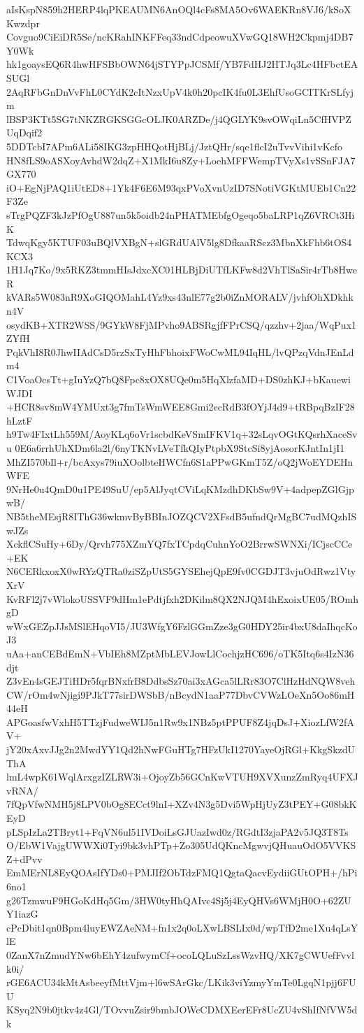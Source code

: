 aIsKspN859h2HERP4lqPKEAUMN6AnOQl4cFs8MA5Ov6WAEKRn8VJ6/kSoXKwzdpr
Covguo9CiEiDR5Se/ncKRahINKFFeq33ndCdpeowuXVwGQ18WH2Ckpmj4DB7Y0Wk
hk1goaysEQ6R4hwHFSBbOWN64jSTYPpJCSMf/YB7FdHJ2HTJq3Lc4HFbctEASUGl
2AqRFbGnDnVvFhL0CYdK2cItNzxUpV4k0h20pcIK4fu0L3EhfUsoGCITKrSLfyjm
lBSP3KTt5SG7tNKZRGKSGGcOLJK0ARZDe/j4QGLYK9svOWqiLn5CfHVPZUqDqif2
5DDTcbI7APm6ALi58IKG3zpHHQotHjBLj/JztQHr/sqe1flcI2uTvvVihi1vKcfo
HN8fLS9oASXoyAvhdW2dqZ+X1MkI6u8Zy+LoehMFFWempTVyXs1vSSnFJA7GX770
iO+EgNjPAQ1iUtED8+1Yk4F6E6M93qxPVoXvnUzID7SNotiVGKtMUEb1Cn22F3Ze
sTrgPQZF3kJzPfOgU887un5k5oidb24nPHATMEbfgOgeqo5baLRP1qZ6VRCt3HiK
TdwqKgy5KTUF03uBQlVXBgN+slGRdUAlV5lg8DfkaaRScz3MbnXkFhb6tOS4KCX3
1H1Jq7Ko/9x5RKZ3tmmHIsJdxcXC01HLBjDiUTfLKFw8d2VhTlSaSir4rTb8HweR
kVARs5W083nR9XoGIQOMahL4Yz9xs43nlE77g2b0iZnMORALV/jvhfOhXDkhkn4V
osydKB+XTR2WSS/9GYkW8FjMPvho9ABSRgjfFPrCSQ/qzzhv+2jaa/WqPux1ZYfH
PqkVhI8R0JhwIIAdCsD5rzSxTyHhFbhoixFWoCwML94IqHL/lvQPzqVdnJEnLdm4
C1VoaOcsTt+gIuYzQ7bQ8Fpc8xOX8UQe0m5HqXlzfaMD+DS0zhKJ+bKauewiWJDI
+HCR8sv8mW4YMUxt3g7fmTsWmWEE8Gmi2ecRdB3fOYjJ4d9+tRBpqBzIF28hLztF
h9Tw4FIxtLh559M/AoyKLq6oVr1scbdKeVSmIFKV1q+32sLqvOGtKQsrhXaceSvu
0E6a6rrhUhXDm6la2l/6nyTKNvLVeTfkQIyPtpbX9StcSi8yjAosorKJntIn1jI1
MhZI570bIl+r/bcAxys79iuXOolbteHWCfn6S1aPPwGKmT5Z/oQ2jWoEYDEHnWFE
9NrHe0u4QmD0u1PE49SuU/ep5AlJyqtCViLqKMzdhDKbSw9V+4adpepZGlGjpwB/
NB5theMEsjR8IThG36wkmvByBBInJOZQCV2XFsdB5ufndQrMgBC7udMQzhISwJZs
XckflCSuHy+6Dy/Qrvh775XZmYQ7fxTCpdqCuhnYoO2BrrwSWNXi/ICjscCCe+EK
N6CERkxoxX0wRYzQTRa0ziSZpUtS5GYSEhejQpE9fv0CGDJT3vjuOdRwz1VtyXrV
KvRFl2j7vWlokoUSSVF9dHm1ePdtjfxh2DKilm8QX2NJQM4hExoixUE05/ROmhgD
wWxGEZpJJsMSlEHqoVI5/JU3WfgY6FzlGGmZze3gG0HDY25ir4bxU8daIhqcKoJ3
uAa+anCEBdEmN+VbIEh8MZptMbLEVJowLlCochjzHC696/oTK5Itq6s4IzN36djt
Z3vEn4sGEJTiHDr5fqrBNxfrB8DdbsSz70ai3xAGca5lLRr83O7ClHzHdNQW8veh
CW/rOm4wNjigi9PJkT77sirDWSbB/nBcydN1aaP77DbvCVWzLOeXn5Oo86mH44eH
APGoasfwVxhH5TTzjFudweWIJ5n1Rw9x1NBz5ptPPUF8Z4jqDsJ+XiozLfW2fAV+
jY20xAxvJJg2n2MwdYY1Qd2hNwFGuHTg7HFzUkI1270YayeOjRGl+KkgSkzdUThA
lmL4wpK61WqlArxgzIZLRW3i+OjoyZb56GCnKwVTUH9XVXunzZmRyq4UFXJvRNA/
7fQpVfwNMH5j8LPV0bOg8ECct9lnI+XZv4N3g5Dvi5WpHjUyZ3tPEY+G08bkKEyD
pLSpIzLa2TBryt1+FqVN6ul51IVDoiLsGJUazIwd0z/RGdtI3zjaPA2v5JQ3T8Ts
O/EbW1VajgUWWXi0Tyi9bk3vhPTp+Zo305UdQKncMgwvjQHuauOdO5VVKSZ+dPvv
EmMErNL8EyQOAsIfYDs0+PMJIf2ObTdzFMQ1QgtaQacvEydiiGUtOPH+/hPi6no1
g26TzmwuF9HGoKdHq5Gm/3HW0tyHhQAIvc4Sj5j4EyQHVs6WMjH0O+62ZUY1iazG
cPcDbit1qn0Bpm4luyEWZAeNM+fn1x2q0oLXwLBSLIx0d/wpTfD2me1Xu4qLsYlE
0ZanX7nZmudYNw6bEhY4zufwymCf+ocoLQLuSzLssWzvHQ/XK7gCWUefFvvlk0i/
rGE6ACU34kMtAsbeeyfMttVjm+l6wSArGkc/LKik3viYzmyYmTe0LgqN1pjj6FUU
KSyq2N9b0jtkv4z4Gl/TOvvuZsir9bmbJOWcCDMXEerEFr8UcZU4vShIfNfVW5dk
